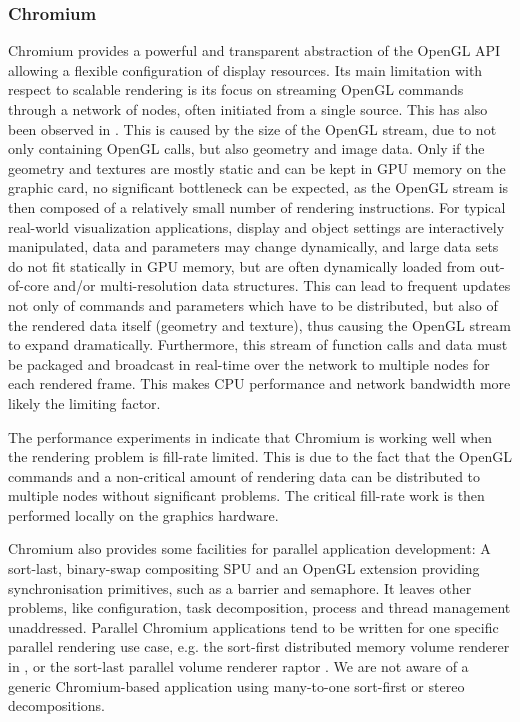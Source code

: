 \subsubsection{Chromium}

Chromium \cite{HHNFAKK:02} provides a powerful and transparent abstraction of
the OpenGL API allowing a flexible configuration of display resources. Its
main limitation with respect to scalable rendering is its focus on
streaming OpenGL commands through a network of nodes, often initiated from a
single source. This has also been observed in \cite{SWNH:03}.
This is caused by the size of the OpenGL stream, due to not only containing OpenGL
calls, but also geometry and image data. Only if the geometry and textures are
mostly static and can be kept in GPU memory on the graphic card, no
significant bottleneck can be expected, as the OpenGL stream is then composed of
a relatively small number of rendering instructions. For typical
real-world visualization applications, display and object settings are
interactively manipulated, data and parameters may change dynamically, and
large data sets do not fit statically in GPU memory, but are often dynamically
loaded from out-of-core and/or multi-resolution data structures. This can lead
to frequent updates not only of commands and parameters which have to be
distributed, but also of the rendered data itself (geometry and texture), thus
causing the OpenGL stream to expand dramatically. Furthermore, this stream of
function calls and data must be packaged and broadcast in real-time over the
network to multiple nodes for each rendered frame. This makes CPU performance
and network bandwidth more likely the limiting factor.

The performance experiments in \cite{HHNFAKK:02} indicate that Chromium is
working well when the rendering problem is fill-rate limited. This is due
to the fact that the OpenGL commands and a non-critical amount of rendering data
can be distributed to multiple nodes without significant problems. The
critical fill-rate work is then performed locally on the graphics hardware.

Chromium also provides some facilities for parallel application development:
A sort-last, binary-swap compositing SPU and an OpenGL extension
providing synchronisation primitives, such as a barrier and semaphore. It leaves
other problems, like configuration, task decomposition, process and
thread management unaddressed. Parallel Chromium applications tend to be written
for one specific parallel rendering use case, e.g. the sort-first
distributed memory volume renderer in \cite{BHPB:03}, or the sort-last parallel
volume renderer raptor \cite{Raptor}. We are not aware of a generic
Chromium-based application using many-to-one sort-first or stereo
decompositions.

